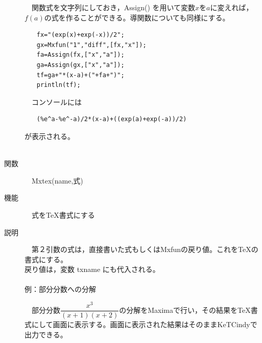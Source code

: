 \documentclass[papersize,a4paper,12pt,uplatex]{jsarticle}
\begin{document}
\begin{description}
　関数式を文字列にしておき，Assign() を用いて変数$x$を$a$に変えれば，$f(a)$の式を作ることができる。導関数についても同様にする。\\
\begin{verbatim}
　　fx="(exp(x)+exp(-x))/2";
　　gx=Mxfun("1","diff",[fx,"x"]);
　　fa=Assign(fx,["x","a"]);
　　ga=Assign(gx,["x","a"]);
　　tf=ga+"*(x-a)+("+fa+")";
　　println(tf);
\end{verbatim}
　コンソールには
\begin{verbatim}
　　(%e^a-%e^-a)/2*(x-a)+((exp(a)+exp(-a))/2) 
\end{verbatim}
が表示される。\\
　\\

\hypertarget{mxtex}{}
\item[関数]　Mxtex(name,式)
\item[機能]　式をTeX書式にする
\item[説明]　第２引数の式は，直接書いた式もしくはMxfunの戻り値。これをTeXの書式にする。\\
戻り値は，変数 txname にも代入される。\\
　\\
例：部分分数への分解
\begin{spacing}{1.5}
　部分分数$\dfrac{x^3}{(x+1)(x+2)}$の分解をMaximaで行い，その結果をTeX書式にして画面に表示する。画面に表示された結果はそのままKeTCindyで出力できる。
\end{spacing}


\end{description}
\end{document}
